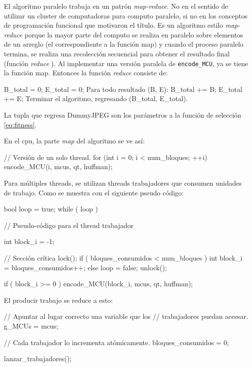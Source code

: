 El algoritmo paralelo trabaja en un patrón \emph{map-reduce}. No en el sentido
de utilizar un cluster de computadoras para computo paralelo, si no en los
conceptos de programación funcional que motivaron el título. Es un algoritmo
estilo \emph{map-reduce} porque la mayor parte del computo se realiza en
paralelo sobre elementos de un arreglo (el correspondiente a la función map) y
cuando el proceso paralelo termina, se realiza una recolección secuencial para
obtener  el resultado final (función \emph{ reduce }). Al implementar una
versión paralela de \verb+encode_MCU+, ya se tiene la función map. Entonces la
función \emph{reduce} consiste de:

\label{alg:mcu_paralelo}
\begin{code}
    B_total = 0;
    E_total = 0;
    Para todo resultado (B, E):
       B_total += B;
       E_total += E;
    Terminar el algoritmo, regresando (B_total, E_total).
\end{code}

La tupla que regresa DummyJPEG son los parámetros a la función de selección
\ref{eq:fitness}.

En el cpu, la parte \emph{map} del algoritmo se ve así:

\begin{code}[language=C][h]
    // Versión de un solo thread.
    for (int i = 0; i < num_bloques; ++i) {
        encode_MCU(i, mcus, qt, huffman);
    }
\end{code}

Para múltiples threads, se utilizan threads trabajadores que consumen unidades
de trabajo. Como se muestra con el siguiente pseudo código:

\begin{code}[language=C][h]
    bool loop = true;
    while ( loop ) {
        // Pseudo-código para el thread trabajador

        int block_i = -1;

        // Sección crítica
        lock();
        if ( bloques_consumidos < num_bloques ) {
            int block_i = bloques_consumidos++;
        } else {
            loop = false;
        }
        unlock();

        if ( block_i >= 0 ) {
            encode_MCU(block_i, mcus, qt, huffman);
        }
    }
\end{code}

El producir trabajo se reduce a esto:

\begin{code}[language=C][h]
    // Apuntar al lugar correcto una variable que los
    // trabajadores puedan accesar.
    g_MCUs = mcus;

    // Cada trabajador lo incrementa atómicamente.
    bloques_consumidos = 0;

    lanzar_trabajadores();
\end{code}

